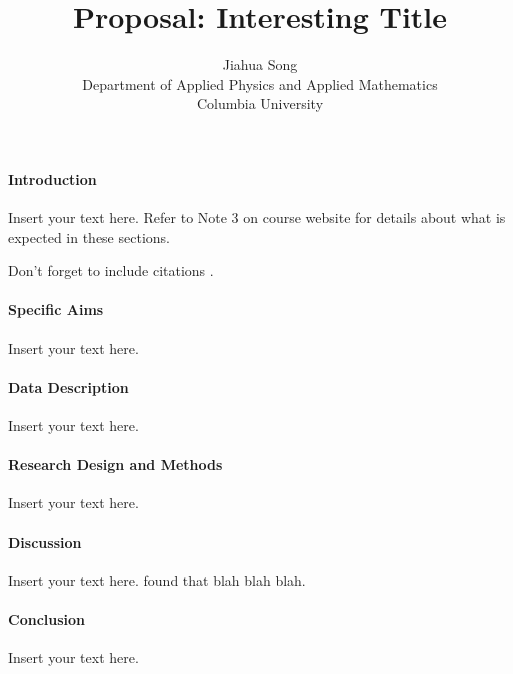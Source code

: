 \documentclass[12pt]{article}
\title{Proposal: Interesting Title}
\author{Jiahua Song\\
  Department of Applied Physics and Applied Mathematics\\
  Columbia University
}
\begin{document}
\maketitle


\paragraph{Introduction}
Insert your text here.  Refer to Note 3 on course website for details about what 
is expected in these sections. 

Don't forget to include citations \citep{dwivedi2017analysis}.

\paragraph{Specific Aims}
Insert your text here.

\paragraph{Data Description}
Insert your text here.

\paragraph{Research Design and Methods}
Insert your text here.

\paragraph{Discussion}
Insert your text here. \citet{wild2004global} found that blah blah blah.

\paragraph{Conclusion}
Insert your text here.




\end{document}

